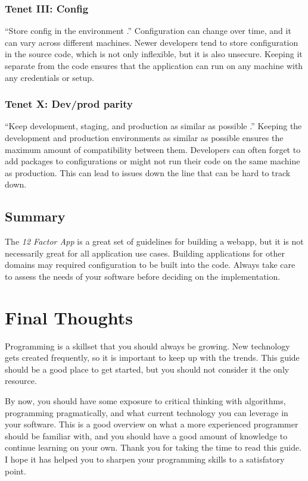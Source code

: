 \documentclass[12pt, oneside, a4paper]{book}
\begin{document}
      \subsection{Tenet III: Config}
      ``Store config in the environment \autocite{wigginsTwelveFactorApp2017}.''
      Configuration can change over time, and it can vary across different machines.
      Newer developers tend to store configuration in the source code, which is not only inflexible, but it is also unsecure.
      Keeping it separate from the code ensures that the application can run on any machine with any credentials or setup.

      \subsection{Tenet X: Dev/prod parity}
      ``Keep development, staging, and production as similar as possible \autocite{wigginsTwelveFactorApp2017}.''
      Keeping the development and production environments as similar as possible ensures the maximum amount of compatibility between them.
      Developers can often forget to add packages to configurations or might not run their code on the same machine as production.
      This can lead to issues down the line that can be hard to track down.

      \section{Summary}
      The \textit{12 Factor App} is a great set of guidelines for building a webapp, but it is not necessarily great for all application use cases.
      Building applications for other domains may required configuration to be built into the code.
      Always take care to assess the needs of your software before deciding on the implementation.

      \chapter{Final Thoughts}
      Programming is a skillset that you should always be growing.
      New technology gets created frequently, so it is important to keep up with the trends.
      This guide should be a good place to get started, but you should not consider it the only resource.

      By now, you should have some exposure to critical thinking with algorithms, programming pragmatically, and what current technology you can leverage in your software.
      This is a good overview on what a more experienced programmer should be familiar with, and you should have a good amount of knowledge to continue learning on your own.
      Thank you for taking the time to read this guide.
      I hope it has helped you to sharpen your programming skills to a satisfatory point.
\end{document}
